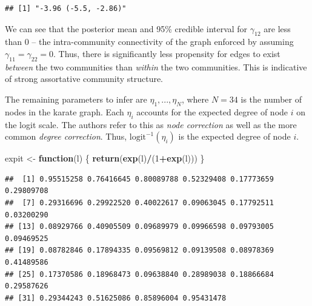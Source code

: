 \documentclass[]{article}
\newenvironment{Shaded}{\begin{snugshade}}{\end{snugshade}}
\newcommand{\ControlFlowTok}[1]{\textcolor[rgb]{0.13,0.29,0.53}{\textbf{#1}}}
\newcommand{\DecValTok}[1]{\textcolor[rgb]{0.00,0.00,0.81}{#1}}
\newcommand{\KeywordTok}[1]{\textcolor[rgb]{0.13,0.29,0.53}{\textbf{#1}}}
\newcommand{\NormalTok}[1]{#1}
\newcommand{\OperatorTok}[1]{\textcolor[rgb]{0.81,0.36,0.00}{\textbf{#1}}}
\newcommand{\StringTok}[1]{\textcolor[rgb]{0.31,0.60,0.02}{#1}}
\begin{document}
\begin{Shaded}
\end{Shaded}

\begin{verbatim}
## [1] "-3.96 (-5.5, -2.86)"
\end{verbatim}

We can see that the posterior mean and 95\% credible interval for
\(\gamma_{12}\) are less than 0 -- the intra-community connectivity of
the graph enforced by assuming \(\gamma_{11} = \gamma_{22} = 0\). Thus,
there is significantly less propensity for edges to exist \emph{between}
the two communities than \emph{within} the two communities. This is
indicative of strong assortative community structure.

The remaining parameters to infer are \(\eta_1,...,\eta_{N}\), where
\(N = 34\) is the number of nodes in the karate graph. Each \(\eta_i\)
accounts for the expected degree of node \(i\) on the logit scale. The
authors refer to this as \emph{node correction} as well as the more
common \emph{degree correction}. Thus, \(\text{logit}^{-1}(\eta_i)\) is
the expected degree of node \(i\).

\begin{Shaded}
\begin{Highlighting}[]
\NormalTok{expit <-}\StringTok{ }\ControlFlowTok{function}\NormalTok{(l)}
\NormalTok{\{}
  \KeywordTok{return}\NormalTok{(}\KeywordTok{exp}\NormalTok{(l)}\OperatorTok{/}\NormalTok{(}\DecValTok{1}\OperatorTok{+}\KeywordTok{exp}\NormalTok{(l)))}
\NormalTok{\}}
\end{Highlighting}
\end{Shaded}

\begin{Shaded}
\end{Shaded}

\begin{verbatim}
##  [1] 0.95515258 0.76416645 0.80089788 0.52329408 0.17773659 0.29809708
##  [7] 0.29316696 0.29922520 0.40022617 0.09063045 0.17792511 0.03200290
## [13] 0.08929766 0.40905509 0.09689979 0.09966598 0.09793005 0.09469525
## [19] 0.08782846 0.17894335 0.09569812 0.09139508 0.08978369 0.41489586
## [25] 0.17370586 0.18968473 0.09638840 0.28989038 0.18866684 0.29587626
## [31] 0.29344243 0.51625086 0.85896004 0.95431478
\end{verbatim}
\end{document}
